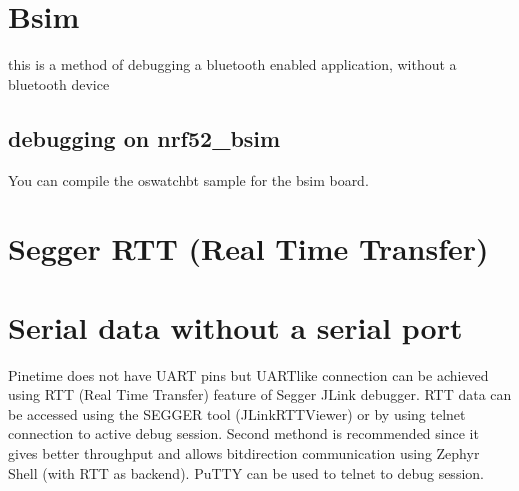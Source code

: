 \documentclass[letterpaper,10pt,english]{sphinxmanual}
\begin{document}
\section{Bsim}
\label{\detokenize{debugging/bsim:bsim}}\label{\detokenize{debugging/bsim::doc}}
this is a method of debugging a bluetooth enabled application, without a bluetooth device


\subsection{debugging on nrf52\_bsim}
\label{\detokenize{debugging/bsim:debugging-on-nrf52-bsim}}
You can compile the oswatch\sphinxhyphen{}bt sample for the bsim board.

\begin{sphinxVerbatim}[commandchars=\\\{\}]
     

 
     
  
\end{sphinxVerbatim}


\section{Segger RTT (Real Time Transfer)}
\label{\detokenize{debugging/jlink:segger-rtt-real-time-transfer}}\label{\detokenize{debugging/jlink::doc}}

\section{Serial data without a serial port}
\label{\detokenize{debugging/jlink:serial-data-without-a-serial-port}}
Pinetime does not have UART pins but UART\sphinxhyphen{}like connection can be achieved using RTT (Real Time Transfer)
feature of Segger JLink debugger. RTT data can be accessed using the SEGGER tool (JLinkRTTViewer) or by using
telnet connection to active debug session. Second methond is recommended since it gives better throughput
and allows bitdirection communication using Zephyr Shell (with RTT as backend). PuTTY can be used to
telnet to debug session.
\end{document}
